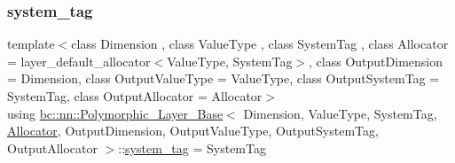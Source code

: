 \mbox{\label{structbc_1_1nn_1_1Polymorphic__Layer__Base_a038901ff126b59392a45ffb2d839b3b0}} 
\subsubsection{\texorpdfstring{system\+\_\+tag}{system\_tag}\hspace{0.1cm}{\footnotesize\ttfamily [2/2]}}
{\footnotesize\ttfamily template$<$class Dimension , class Value\+Type , class System\+Tag , class Allocator  = layer\+\_\+default\+\_\+allocator$<$\+Value\+Type, System\+Tag$>$, class Output\+Dimension  = Dimension, class Output\+Value\+Type  = Value\+Type, class Output\+System\+Tag  = System\+Tag, class Output\+Allocator  = Allocator$>$ \\
using \hyperlink{structbc_1_1nn_1_1Polymorphic__Layer__Base}{bc\+::nn\+::\+Polymorphic\+\_\+\+Layer\+\_\+\+Base}$<$ Dimension, Value\+Type, System\+Tag, \hyperlink{classbc_1_1allocators_1_1Allocator}{Allocator}, Output\+Dimension, Output\+Value\+Type, Output\+System\+Tag, Output\+Allocator $>$\+::\hyperlink{structbc_1_1nn_1_1Polymorphic__Layer__Base_a038901ff126b59392a45ffb2d839b3b0}{system\+\_\+tag} =  System\+Tag}

\mbox{\label{structbc_1_1nn_1_1Polymorphic__Layer__Base_a6240b9012fcc8ed91d8a41f07d7c4bd9}} 
